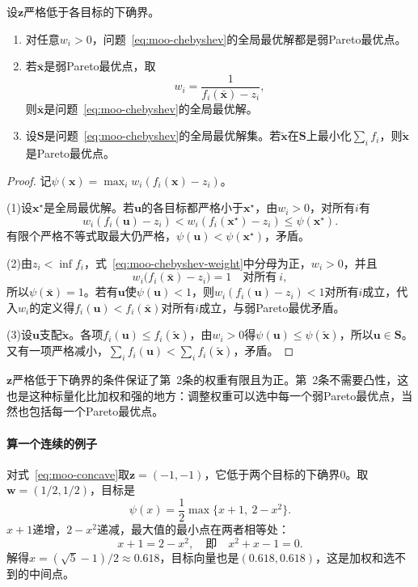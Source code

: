\begin{theorem}[加权Chebyshev的解]
\label{thm:moo-chebyshev}
设$\bm{z}$严格低于各目标的下确界。
\begin{enumerate}
 \item 对任意$w_i>0$，问题~\eqref{eq:moo-chebyshev}的全局最优解都是弱Pareto最优点。
 \item 若$\bar{\bm{x}}$是弱Pareto最优点，取
 \begin{equation}
  w_i=\frac{1}{f_i(\bar{\bm{x}})-z_i},
  \label{eq:moo-chebyshev-weight}
 \end{equation}
 则$\bar{\bm{x}}$是问题~\eqref{eq:moo-chebyshev}的全局最优解。
 \item 设$\bm{S}$是问题~\eqref{eq:moo-chebyshev}的全局最优解集。若$\tilde{\bm{x}}$在$\bm{S}$上最小化$\sum_if_i$，则$\tilde{\bm{x}}$是Pareto最优点。
\end{enumerate}
\end{theorem}

\begin{proof}
记$\psi(\bm{x})=\max_iw_i(f_i(\bm{x})-z_i)$。

(1)设$\bm{x}^\star$是全局最优解。若$\bm{u}$的各目标都严格小于$\bm{x}^\star$，由$w_i>0$，对所有$i$有
\[
 w_i(f_i(\bm{u})-z_i)<w_i(f_i(\bm{x}^\star)-z_i)\leq\psi(\bm{x}^\star).
\]
有限个严格不等式取最大仍严格，$\psi(\bm{u})<\psi(\bm{x}^\star)$，矛盾。

(2)由$z_i<\inf f_i$，式~\eqref{eq:moo-chebyshev-weight}中分母为正，$w_i>0$，并且
\[
 w_i\bigl(f_i(\bar{\bm{x}})-z_i\bigr)=1\quad\text{对所有}\ i,
\]
所以$\psi(\bar{\bm{x}})=1$。若有$\bm{u}$使$\psi(\bm{u})<1$，则$w_i(f_i(\bm{u})-z_i)<1$对所有$i$成立，代入$w_i$的定义得$f_i(\bm{u})<f_i(\bar{\bm{x}})$对所有$i$成立，与弱Pareto最优矛盾。

(3)设$\bm{u}$支配$\tilde{\bm{x}}$。各项$f_i(\bm{u})\leq f_i(\tilde{\bm{x}})$，由$w_i>0$得$\psi(\bm{u})\leq\psi(\tilde{\bm{x}})$，所以$\bm{u}\in\bm{S}$。又有一项严格减小，$\sum_if_i(\bm{u})<\sum_if_i(\tilde{\bm{x}})$，矛盾。
\end{proof}

$\bm{z}$严格低于下确界的条件保证了第~2条的权重有限且为正。第~2条不需要凸性，这也是这种标量化比加权和强的地方：调整权重可以选中每一个弱Pareto最优点，当然也包括每一个Pareto最优点。

\paragraph{算一个连续的例子}
对式~\eqref{eq:moo-concave}取$\bm{z}=(-1,-1)$，它低于两个目标的下确界$0$。取$\bm{w}=(1/2,1/2)$，目标是
\[
 \psi(x)=\frac12\max\bigl\{x+1,\ 2-x^2\bigr\}.
\]
$x+1$递增，$2-x^2$递减，最大值的最小点在两者相等处：
\[
 x+1=2-x^2,\quad\text{即}\quad x^2+x-1=0.
\]
解得$x=(\sqrt5-1)/2\approx0.618$，目标向量也是$(0.618,0.618)$，这是加权和选不到的中间点。

